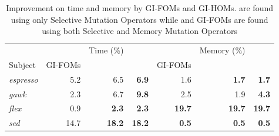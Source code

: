 \documentclass[oribibl]{llncs}
\begin{document}

\begin{table}[!ht]
\centering
\caption{Improvement on time and memory by GI-FOMs and GI-HOMs. \homss{} are found using only Selective Mutation Operators while \homsa{} and GI-FOMs are found using both Selective and Memory Mutation Operators}
\label{tab_fomhom}
\begin{tabular}{lrrr|rrr}
\hline
         &      & \multicolumn{1}{c}{Time (\%)} &               &               & \multicolumn{1}{c}{Memory (\%)} &               \\
Subject  & GI-FOMs & \homss{}         & \homsa{}          & GI-FOMs          & \homss{}           & \homsa{}          \\
\hline
\emph{espresso} & 5.2  & 6.5                      & \textbf{6.9}  & 1.6           & \textbf{1.7}               & \textbf{1.7}  \\
\emph{gawk}     & 2.3  & 6.7                      & \textbf{9.8}  & 2.5           & 1.9                        & \textbf{4.3}  \\
\emph{flex}     & 0.9  & \textbf{2.3}             & \textbf{2.3}  & \textbf{19.7} & \textbf{19.7}              & \textbf{19.7} \\
\emph{sed}      & 14.7 & \textbf{18.2}            & \textbf{18.2} & \textbf{0.5}  & \textbf{0.5}               & \textbf{0.5} \\
\hline
\end{tabular}
\vspace{-4mm}
\end{table}
\end{document}
